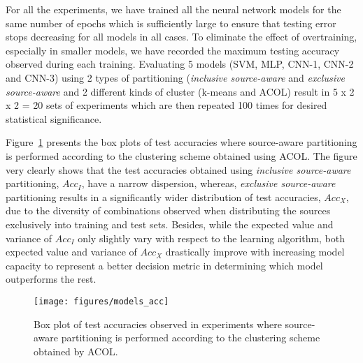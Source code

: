 \documentclass[letterpaper]{article}
\begin{document}
For all the experiments, we have trained all the neural network models for the same number of epochs which is sufficiently large to ensure that testing error stops decreasing for all models in all cases. To eliminate the effect of overtraining, especially in smaller models, we have recorded the maximum testing accuracy observed during each training. Evaluating 5 models (SVM, MLP, CNN-1, CNN-2 and CNN-3) using 2 types of partitioning (\textit{inclusive source-aware} and \textit{exclusive source-aware} and 2 different kinds of cluster (k-means and ACOL) result in 5 x 2 x 2 = 20 sets of experiments which are then repeated 100 times for desired statistical significance. 

Figure~\ref{fig:model_acc_box} presents the box plots of test accuracies where source-aware partitioning is performed according to the clustering scheme obtained using ACOL.  The figure very clearly shows that the test accuracies obtained using \textit{inclusive source-aware} partitioning, $Acc_I$, have a narrow dispersion, whereas, \textit{exclusive source-aware} partitioning results in a significantly wider distribution of test accuracies, $Acc_X$, due to the diversity of combinations observed when distributing the sources exclusively into training and test sets. Besides, while the expected value and variance of $Acc_I$ only slightly vary with respect to the learning algorithm, both expected value and variance of $Acc_X$ drastically improve with increasing model capacity to represent a better decision metric in determining which model outperforms the rest.

\begin{figure}[ht]
	\begin{center}
		\centerline{\texttt{[image: figures/models\_acc]}}
		\caption{Box plot of test accuracies observed in experiments where source-aware partitioning is performed according to the clustering scheme obtained by ACOL.}
		\label{fig:model_acc_box}
	\end{center}
	\vskip -0.2in
\end{figure}
\end{document}
